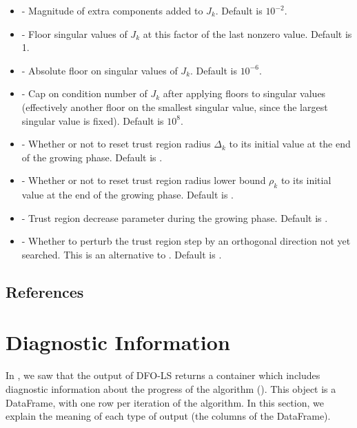 \documentclass[letterpaper,10pt,english]{sphinxmanual}
\begin{document}
\begin{itemize}
\item {} 
 - Magnitude of extra components added to \(J_k\). Default is \(10^{-2}\).

\item {} 
 - Floor singular values of \(J_k\) at this factor of the last nonzero value. Default is 1.

\item {} 
 - Absolute floor on singular values of \(J_k\). Default is \(10^{-6}\).

\item {} 
 - Cap on condition number of \(J_k\) after applying floors to singular values (effectively another floor on the smallest singular value, since the largest singular value is fixed). Default is \(10^8\).

\item {} 
 - Whether or not to reset trust region radius \(\Delta_k\) to its initial value at the end of the growing phase. Default is .

\item {} 
 - Whether or not to reset trust region radius lower bound \(\rho_k\) to its initial value at the end of the growing phase. Default is .

\item {} 
 - Trust region decrease parameter during the growing phase. Default is .

\item {} 
 - Whether to perturb the trust region step by an orthogonal direction not yet searched. This is an alternative to . Default is .

\end{itemize}


\section{References}
\label{\detokenize{advanced:references}}

\chapter{Diagnostic Information}
\label{\detokenize{diagnostic::doc}}\label{\detokenize{diagnostic:diagnostic-information}}
In {\hyperref[\detokenize{userguide::doc}]{}}, we saw that the output of DFO-LS returns a container which includes diagnostic information about the progress of the algorithm (). This object is a  DataFrame, with one row per iteration of the algorithm. In this section, we explain the meaning of each type of output (the columns of the DataFrame).
\end{document}
